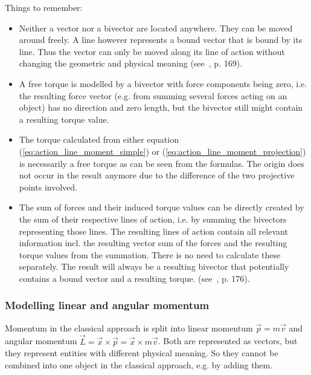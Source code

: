 Things to remember:
\begin{itemize}
    \item Neither a vector nor a bivector are located anywhere. They can be moved around
    freely. A line however represents a bound vector that is bound by its line. Thus the
    vector can only be moved along its line of action without changing the geometric and
    physical meaning (see~\cite{Browne_Grassmann-Algebra_Vol1:2012}, p. 169).
    \item A free torque is modelled by a bivector with force components being zero, i.e.
    the resulting force vector (e.g. from summing several forces acting on an object) has
    no direction and zero length, but the bivector still might contain a resulting torque
    value.
    \item The torque calculated from either equation (\ref{eq:action_line_moment_simple})
    or (\ref{eq:action_line_moment_projection}) is necessarily a free torque as can be
    seen from the formulas. The origin does not occur in the result anymore due to the
    difference of the two projective points involved.
    \item The sum of forces and their induced torque values can be directly created by the
    sum of their respective lines of action, i.e. by summing the bivectors representing
    those lines. The resulting lines of action contain all relevant information incl. the
    resulting vector sum of the forces and the resulting torque values from the summation.
    There is no need to calculate these separately. The result will always be a resulting
    bivector that potentially contains a bound vector and a resulting torque.
    (see~\cite{Browne_Grassmann-Algebra_Vol1:2012}, p. 176).
\end{itemize}



\subsubsection{Modelling linear and angular momentum}
\label{subsubsection_modelling_momentum}

Momentum in the classical approach is split into linear momentum $\vec{p} = m\vec{v}$ and
angular momentum $\vec{L} = \vec{x} \times \vec{p} = \vec{x} \times m \vec{v}$. Both are
represented as vectors, but they represent entities with different physical meaning. So
they cannot be combined into one object in the classical approach, e.g. by adding them. \\

